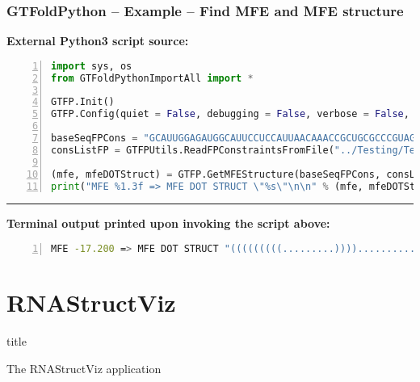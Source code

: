 \documentclass[usenames,svgnames,dvipsnames,11pt]{beamer}
\newcommand{\TitleBoxed}[1]{
     \begin{beamercolorbox}[sep=8pt,center,shadow=true,rounded=true]{title}
          \usebeamerfont{title}#1\par%
     \end{beamercolorbox}
}
\begin{document}
\begin{frame}[fragile]
\frametitle{GTFoldPython -- Example -- Find MFE and MFE structure}

\small\noindent
\textbf{External Python3 script source:}
\begin{lstlisting}[language=Python,basicstyle=\tiny\ttfamily,keywordstyle=\bfseries\color{green!40!black},
                   commentstyle=\itshape\color{purple!40!black},identifierstyle=\color{blue!63!green},
                   stringstyle=\color{orange},frame=none,keepspaces=true,numbers=left,xleftmargin=0.28cm]
import sys, os
from GTFoldPythonImportAll import *

GTFP.Init()
GTFP.Config(quiet = False, debugging = False, verbose = False, stdmsgout = "stderr")

baseSeqFPCons = "GCAUUGGAGAUGGCAUUCCUCCAUUAACAAACCGCUGCGCCCGUAGCAGCUGAUGAUGCCUACAGA"
consListFP = GTFPUtils.ReadFPConstraintsFromFile("../Testing/TestData/tRNA/yeast.fa.cons")

(mfe, mfeDOTStruct) = GTFP.GetMFEStructure(baseSeqFPCons, consListFP)
print("MFE %1.3f => MFE DOT STRUCT \"%s\"\n\n" % (mfe, mfeDOTStruct))
\end{lstlisting}

\medskip\hrule\medskip

\small\noindent
\textbf{Terminal output printed upon invoking the script above:}
\begin{lstlisting}[language=bash,basicstyle=\tiny\ttfamily,keywordstyle=\bfseries\color{green!40!black},
                   commentstyle=\itshape\color{purple!40!black},identifierstyle=\color{blue!63!green},
                   stringstyle=\color{orange},frame=none,keepspaces=true,numbers=left,xleftmargin=0.28cm]
MFE -17.200 => MFE DOT STRUCT "(((((((((.........))))...........(((((.......)))))....)))))......."
\end{lstlisting}

\end{frame}

\section{RNAStructViz}

\begin{frame}
\TitleBoxed{
     \Huge{\centerline{The RNAStructViz application}}
}
\end{frame}
\end{document}
